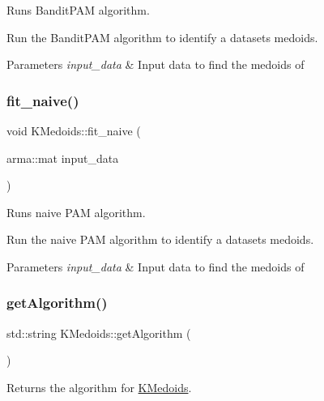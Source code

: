 Runs Bandit\+P\+AM algorithm. 

Run the Bandit\+P\+AM algorithm to identify a dataset\textquotesingle{}s medoids.


\begin{DoxyParams}{Parameters}
{\em input\+\_\+data} & Input data to find the medoids of \\
\hline
\end{DoxyParams}
\mbox{\label{classKMedoids_a79fbb790f9f31bcaf1daa05e5eb5daa8}} 
\subsubsection{\texorpdfstring{fit\+\_\+naive()}{fit\_naive()}}
{\footnotesize\ttfamily void K\+Medoids\+::fit\+\_\+naive (\begin{DoxyParamCaption}\item[{arma\+::mat}]{input\+\_\+data }\end{DoxyParamCaption})\hspace{0.3cm}{\ttfamily [private]}}



Runs naive P\+AM algorithm. 

Run the naive P\+AM algorithm to identify a dataset\textquotesingle{}s medoids.


\begin{DoxyParams}{Parameters}
{\em input\+\_\+data} & Input data to find the medoids of \\
\hline
\end{DoxyParams}
\mbox{\label{classKMedoids_a01a1bf63fdd2cd8b389c3f1c0619388f}} 
\subsubsection{\texorpdfstring{get\+Algorithm()}{getAlgorithm()}}
{\footnotesize\ttfamily std\+::string K\+Medoids\+::get\+Algorithm (\begin{DoxyParamCaption}{ }\end{DoxyParamCaption})}



Returns the algorithm for \hyperlink{classKMedoids}{K\+Medoids}. 


